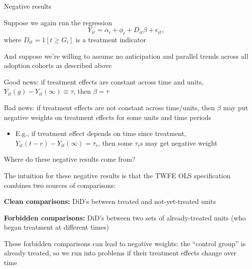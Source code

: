 \documentclass[usenames, dvipsnames, aspectratio = 169, 13pt]{beamer}
\newenvironment{wideitemize}{\itemize\addtolength{\itemsep}{10pt}}{\enditemize}
\begin{document}
\begin{frame}{Negative results}
    \begin{wideitemize}
        \item
        Suppose we again run the regression
            $$Y_{it} = \alpha_i + \phi_t + D_{it} \beta  + \epsilon_{it}, $$
        \noindent where $D_{it} = 1[t \geq G_i]$ is a treatment indicator
        
        \item
        And suppose we're willing to assume no anticipation and  parallel trends across all adoption cohorts as described above
        
        \pause
        \item
        Good news: if treatment effects are constant across time and units, $Y_{it}(g) - Y_{it}(\infty) \equiv \tau$, then $\beta = \tau$
        
        \pause
        \item
        Bad news: if treatment effects are not constant across time/units, then $\beta$ may put negative weights on treatment effects for some units and time periods
            \begin{itemize}
                \item
                E.g., if treatment effect depends on time since treatment, $Y_{it}(t-r) - Y_{it}(\infty) = \tau_{r}$, then some $\tau_r$s may get negative weight
            \end{itemize}
    \end{wideitemize}
\end{frame}

\begin{frame}{Where do these negative results come from?}
    \begin{wideitemize}
        \item
        The intuition for these negative results is that the TWFE OLS specification combines two sources of comparisons:
        
        \medskip
        
        \begin{enumerate}
        {\normalsize
            \item 
            \textbf{Clean comparisons:} DiD's between treated and not-yet-treated units
            
            \medskip 
            
            \item
            \textbf{Forbidden comparisons:} DiD's between two sets of already-treated units (who began treatment at different times)
        }    
        \end{enumerate}
        
    \item
    These forbidden comparisons can lead to negative weights: the ``control group'' is already treated, so we run into problems if their treatment effects change over time
    \end{wideitemize}
\end{frame}
\end{document}
